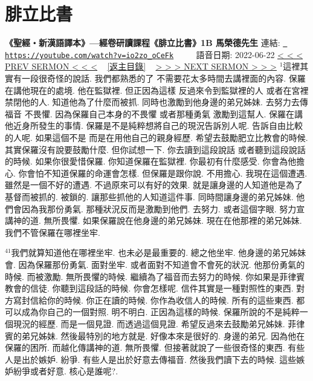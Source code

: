 \documentclass{book}
\begin{document}
\section{腓立比書}
\label{sec:io2zo_oCeFk}
\textbf{《聖經‧新漢語譯本》—經卷研讀課程《腓立比書》1B 馬榮德先生}
\newline
\newline
連結: \href{https://youtube.com/watch?v=io2zo_oCeFk}{\texttt{ https://youtube.com/watch?v=io2zo\_oCeFk}} ~~~~ 語音日期: 2022-06-22 
\newline
\newline
\hyperref[sec:HhgTqAX1BFU]{\small{< < < PREV SERMON < < <}}
~
\hyperref[sec:index]{\small{[返主目錄]}}
~
\hyperref[sec:XEYwTf6e19I]{\small{> > > NEXT SERMON > > >}}
\newline
\newline
$^{1}$這裡其實有一段很奇怪的說話.
我們都熟悉的了 不需要花太多時間去講裡面的內容.
保羅在講他現在的處境.
他在監獄裡.
但正因為這樣 反過來令到監獄裡的人 或者在宮裡禁閉他的人.
知道他為了什麼而被抓.
同時也激勵到他身邊的弟兄姊妹.
去努力去傳福音 不畏懼.
因為保羅自己本身的不畏懼 或者那種勇氣 激勵到這幫人.
保羅在講他近身所發生的事情.
保羅是不是純粹想將自己的現況告訴別人呢.
告訴自由比較的人呢.
如果這個不是 而是在用他自己的親身經歷.
希望去鼓勵肥立比教會的時候.
其實保羅沒有說要鼓勵什麼.
但你試想一下.
你去讀到這段說話 或者聽到這段說話的時候.
如果你很愛惜保羅.
你知道保羅在監獄裡.
你最初有什麼感受.
你會為他擔心.
你會怕不知道保羅的命運會怎樣.
但保羅是跟你說.
不用擔心.
我現在這個遭遇.
雖然是一個不好的遭遇.
不過原來可以有好的效果.
就是讓身邊的人知道他是為了基督而被抓的.
被鎖的.
讓那些抓他的人知道這件事.
同時間讓身邊的弟兄姊妹.
他們會因為我那份勇氣.
那種狀況反而是激勵到他們.
去努力.
或者這個字眼.
努力宣講神的道.
無所畏懼.
如果保羅說在他身邊的弟兄姊妹.
現在在他那裡的弟兄姊妹.
我們不管保羅在哪裡坐牢.

$^{41}$我們就算知道他在哪裡坐牢.
也未必是最重要的.
總之他坐牢.
他身邊的弟兄姊妹會.
因為保羅那份勇氣.
面對坐牢.
或者面對不知道會不會死的狀況.
他那份勇氣的時候.
而被激勵.
無所畏懼的時候.
繼續為了福音而去努力的時候.
你如果是菲律賓教會的信徒.
你聽到這段話的時候.
你會怎樣呢.
信件其實是一種對照性的東西.
對方寫封信給你的時候.
你正在讀的時候.
你作為收信人的時候.
所有的這些東西.
都可以成為你自己的一個對照.
明不明白.
正因為這樣的時候.
保羅所說的不是純粹一個現況的經歷.
而是一個見證.
而透過這個見證.
希望反過來去鼓勵弟兄姊妹.
菲律賓的弟兄姊妹.
然後最特別的地方就是.
好像本來是很好的.
身邊的弟兄.
因為他在保羅的困所.
而越化傳講神的道.
無所畏懼.
但接著就說了一些很奇怪的東西.
有些人是出於嫉妒.
紛爭.
有些人是出於好意去傳福音.
然後我們讀下去的時候.
這些嫉妒紛爭或者好意.
核心是誰呢?.
\end{document}
